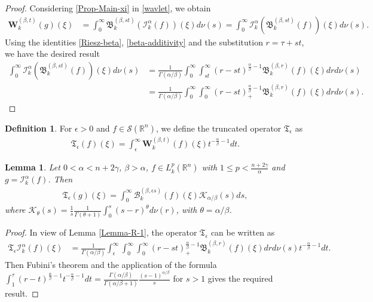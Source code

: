 \documentclass[11pt,a4paper,reqno]{amsproc}
\newtheorem{lemma}[theorem]{Lemma}
\theoremstyle{definition}
\newtheorem{definition}[theorem]{Definition}
\theoremstyle{remark}
\numberwithin{equation}{section}
\begin{document}
\begin{proof}
    Considering \eqref{Prop-Main-xi} in \eqref{wavlet}, we obtain
    \begin{align*}
        \mathbf{W}_k^{(\beta, t)}(g)(\xi)&= \int_0^\infty \mathfrak{B}_k^{(\beta, st)}\left(\mathcal{I}_k^\alpha(f)\right)(\xi) d\nu(s) =\int_0^\infty \mathcal{I}_k^\alpha \left(\mathfrak{B}_k^{(\beta, st)}(f)\right)(\xi) d\nu(s).
    \end{align*} 
    Using the identities \eqref{Riesz-beta}, \eqref{beta-additivity} and the substitution $r=\tau+st$, we have the desired result
    \begin{align*}
        \int_0^\infty \mathcal{I}_k^\alpha\left( \mathfrak{B}_k^{(\beta, st)}(f)\right)(\xi) d\nu(s) &= \frac{1}{\Gamma(\alpha / \beta)}
        \int_0^\infty \int_{st}^\infty (r-st)^{\frac{\alpha}{\beta}-1} \mathfrak{B}_k^{(\beta, r)}(f)(\xi) dr d\nu(s)\\
        & = \frac{1}{\Gamma(\alpha / \beta)} \int_0^\infty \int_{0}^\infty (r-st)_+^{\frac{\alpha}{\beta}-1} \mathfrak{B}_k^{(\beta, r)}(f)(\xi) dr d\nu(s).
    \end{align*}  
\end{proof}
\begin{definition}
  For $\epsilon >0$ and $f \in \mathcal{S}(\mathbb{R}^n)$, we define the truncated operator $\mathfrak{T}_\epsilon$ as 
  \begin{align}\label{truncated function-1}
      \mathfrak{T}_\epsilon (f)(\xi)=  \int_\epsilon^\infty
       \mathbf{W}_k^{(\beta,t)}(f)(\xi) t^{-\frac{\alpha}{\beta}-1}dt.
  \end{align}
\end{definition}
\begin{lemma}\label{Lemma-R-2}
    Let $0< \alpha < n+2\gamma$, $\beta >\alpha $, $f\in L_k^p(\mathbb{R}^n)$ with $1\leq p < \frac{n+2\gamma}{\alpha}$ and $g=\mathcal{I}_k^\alpha(f)$. Then
    \begin{align*}
        \mathfrak{T}_\epsilon (g)(\xi)= \int_0^\infty \mathcal{B}_k^{(\beta, \epsilon s)}(f)(\xi)\mathcal{K}_{\alpha/\beta}(s)ds,
    \end{align*} where $\mathcal{K}_{\theta}(s)= \frac{1}{s} \frac{1}{\Gamma(\theta+1)}\int_0^s (s-r)^\theta d\nu(r)$, with $\theta=\alpha/\beta$. 
\end{lemma}
\begin{proof}
    In view of Lemma \ref{Lemma-R-1}, the operator $ \mathfrak{T}_\epsilon$ can be written as
    \begin{align*}
         \mathfrak{T}_\epsilon\mathcal{I}_k^\alpha (f)(\xi) &= \frac{1}{\Gamma(\alpha / \beta)} \int_\epsilon^\infty 
          \int_0^\infty \int_{0}^\infty (r-st)_+^{\frac{\alpha}{\beta}-1} \mathfrak{B}_k^{(\beta, r)}(f)(\xi) dr d\nu(s) t^{-\frac{\alpha}{\beta}-1}dt.
    \end{align*}
    Then Fubini's theorem and the application of the formula 
$\int_{1}^\tau (r-t)^{\frac{\alpha}{\beta}-1} t^{-\frac{\alpha}{\beta}-1}dt =\frac{\Gamma(\alpha/\beta)}{\Gamma(\alpha/\beta +1)}\frac{(s-1)^{\alpha/\beta}}{s}$ for $s>1$ gives the required result.
\end{proof}
\end{document}
